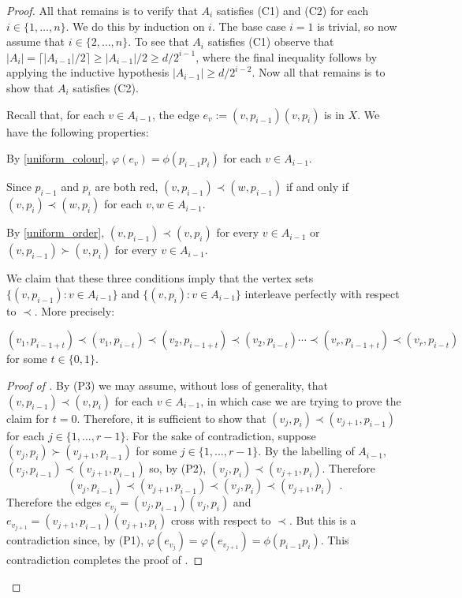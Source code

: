 \documentclass[kpfonts]{patmorin}
\renewcommand{\ge}{\geqslant}
\begin{document}
\begin{proof}
	All that remains is to verify that $A_i$ satisfies (C1) and (C2) for each $i\in\{1,\ldots,n\}$.  We do this by induction on $i$. The base case $i=1$ is trivial, so now assume that $i\in\{2,\ldots,n\}$.   To see that $A_i$ satisfies (C1) observe that $|A_i|=\lceil |A_{i-1}|/2\rceil \ge |A_{i-1}|/2\ge d/2^{i-1}$, where the final inequality follows by applying the inductive hypothesis $|A_{i-1}|\ge d/2^{i-2}$.  Now all that remains is to show that $A_i$ satisfies (C2).

    Recall that, for each $v\in A_{i-1}$, the edge $e_v:=(v,p_{i-1})(v,p_i)$ is in $X$.  We have the following properties:
    \begin{compactenum}[(P1)]
        \item By \cref{uniform_colour}, $\varphi(e_v)=\phi(p_{i-1}p_i)$ for each $v\in A_{i-1}$.
        \item Since $p_{i-1}$ and $p_i$ are both red, $(v,p_{i-1})\prec (w,p_{i-1})$ if and only if $(v,p_{i})\prec (w,p_{i})$ for each $v,w\in A_{i-1}$.
        \item By \cref{uniform_order}, $(v,p_{i-1})\prec (v,p_i)$ for every $v\in A_{i-1}$ or $(v,p_{i-1})\succ (v,p_i)$ for every $v\in A_{i-1}$.
    \end{compactenum}
    We claim that these three conditions imply that the vertex sets $\{(v,p_{i-1}):v\in A_{i-1}\}$ and $\{(v,p_i):v\in A_{i-1}\}$ interleave perfectly with respect to $\prec$. More precisely:
	\begin{clm} $(v_1,p_{i-1+t})\prec (v_1,p_{i-t}) \prec (v_2,p_{i-1+t}) \prec (v_2,p_{i-t}) \cdots \prec (v_r,p_{i-1+t}) \prec (v_r,p_{i-t})$ for some $t\in\{0,1\}$.
	\end{clm}
	\begin{proof}[Proof of ]
		By (P3) we may assume, without loss of generality, that $(v,p_{i-1})\prec (v,p_i)$ for each $v\in A_{i-1}$, in which case we are trying to prove the claim for $t=0$.  Therefore, it is sufficient to show that $(v_j,p_i)\prec (v_{j+1},p_{i-1})$ for each $j\in\{1,\ldots,r-1\}$.  For the sake of contradiction, suppose $(v_j,p_{i})\succ (v_{j+1},p_{i-1})$ for some $j\in\{1,\ldots,r-1\}$. By the labelling of $A_{i-1}$,  $(v_j,p_{i-1})\prec (v_{j+1},p_{i-1})$ so, by (P2),  $(v_{j},p_i) \prec (v_{j+1},p_i)$.  Therefore
		\[
			(v_j,p_{i-1})\prec (v_{j+1},p_{i-1})\prec(v_{j},p_i) \prec
		   (v_{j+1}, p_i) \enspace .
	   	\]
		Therefore the edges $e_{v_j}=(v_j,p_{i-1})(v_j,p_{i})$ and $e_{v_{j+1}}=(v_{j+1},p_{i-1})(v_{j+1},p_i)$ cross with respect to $\prec$.  But this is a contradiction since, by (P1),  $\varphi(e_{v_j}) =\varphi(e_{v_{j+1}})=\phi(p_{i-1}p_i)$.
		This contradiction completes the proof of .
	\end{proof}


\end{proof}
\end{document}

